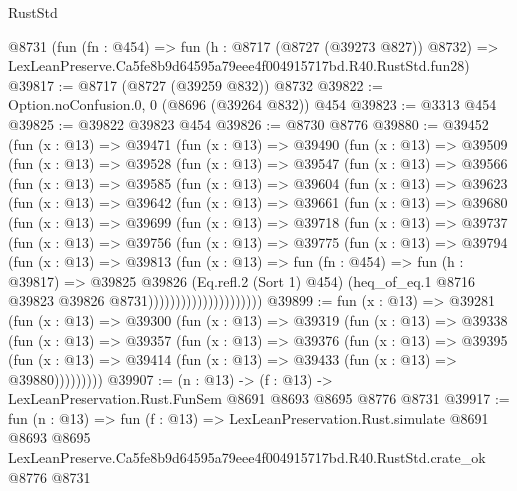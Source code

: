 \begin{lexlean}{RustStd}
\begin{coremodule}
    @8731
    (fun (fn : @454) =>
    fun (h : @8717 (@8727 (@39273 @827)) @8732) =>
    LexLeanPreserve.Ca5fe8b9d64595a79eee4f004915717bd.R40.RustStd.fun28)
@39817 := @8717 (@8727 (@39259 @832)) @8732
@39822 := Option.noConfusion.{0, 0} (@8696 (@39264 @832)) @454
@39823 := @3313 @454
@39825 := @39822 @39823 @454
@39826 := @8730 @8776
@39880 := @39452
    (fun (x : @13) =>
    @39471
      (fun (x : @13) =>
      @39490
        (fun (x : @13) =>
        @39509
          (fun (x : @13) =>
          @39528
            (fun (x : @13) =>
            @39547
              (fun (x : @13) =>
              @39566
                (fun (x : @13) =>
                @39585
                  (fun (x : @13) =>
                  @39604
                    (fun (x : @13) =>
                    @39623
                      (fun (x : @13) =>
                      @39642
                        (fun (x : @13) =>
                        @39661
                          (fun (x : @13) =>
                          @39680
                            (fun (x : @13) =>
                            @39699
                              (fun (x : @13) =>
                              @39718
                                (fun (x : @13) =>
                                @39737
                                  (fun (x : @13) =>
                                  @39756
                                    (fun (x : @13) =>
                                    @39775
                                      (fun (x : @13) =>
                                      @39794
                                        (fun (x : @13) =>
                                        @39813
                                          (fun (x : @13) =>
                                          fun (fn : @454) =>
                                          fun (h : @39817) =>
                                          @39825
                                            @39826
                                            (Eq.refl.{2} (Sort 1) @454)
                                            (heq_of_eq.{1}
                                              @8716
                                              @39823
                                              @39826
                                              @8731)))))))))))))))))))))
@39899 := fun (x : @13) =>
  @39281
    (fun (x : @13) =>
    @39300
      (fun (x : @13) =>
      @39319
        (fun (x : @13) =>
        @39338
          (fun (x : @13) =>
          @39357
            (fun (x : @13) =>
            @39376
              (fun (x : @13) =>
              @39395
                (fun (x : @13) => @39414 (fun (x : @13) => @39433 (fun (x : @13) => @39880)))))))))
@39907 := (n : @13) -> (f : @13) -> LexLeanPreservation.Rust.FunSem @8691 @8693 @8695 @8776 @8731
@39917 := fun (n : @13) =>
  fun (f : @13) =>
  LexLeanPreservation.Rust.simulate
    @8691
    @8693
    @8695
    LexLeanPreserve.Ca5fe8b9d64595a79eee4f004915717bd.R40.RustStd.crate_ok
    @8776
    @8731
\end{coremodule}
\end{lexlean}
